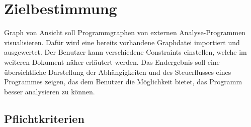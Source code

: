 \chapter{Zielbestimmung}

Graph von Ansicht soll Programmgraphen von externen Analyse-Programmen visualisieren. Dafür wird eine bereits vorhandene Graphdatei importiert und ausgewertet. Der Benutzer kann verschiedene Constraints einstellen, welche im weiteren Dokument näher erläutert werden.
Das Endergebnis soll eine übersichtliche Darstellung der Abhängigkeiten und des Steuerflusses eines Programmes zeigen, das dem Benutzer die Möglichkeit bietet, das Programm besser analysieren zu können.

\section{Pflichtkriterien}

